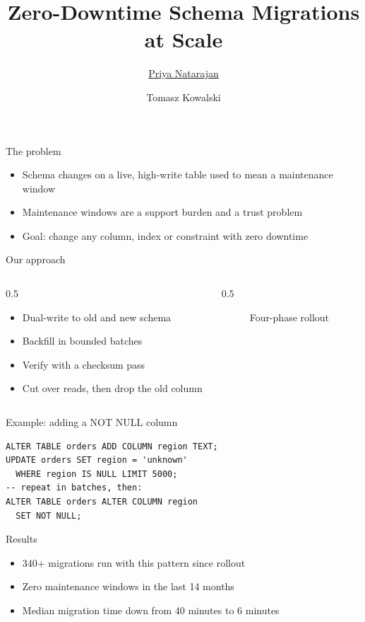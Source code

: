 \documentclass[14pt,aspectratio=169]{beamer}
\title{Zero-Downtime Schema Migrations at Scale}
\author{\underline{Priya Natarajan} \inst{1} \and Tomasz Kowalski \inst{1}}
\institute[shortinst]{\inst{1} Platform Engineering}
\begin{document}
{
  \begin{frame}
    \titlepage
  \end{frame}
}

\begin{frame}{The problem}
  \begin{itemize}
    \item Schema changes on a live, high-write table used to mean a maintenance window
    \item Maintenance windows are a support burden and a trust problem
    \item Goal: change any column, index or constraint with zero downtime
  \end{itemize}
\end{frame}

\begin{frame}{Our approach}
  \begin{columns}
    \begin{column}{0.5\linewidth}
      \begin{itemize}
        \item Dual-write to old and new schema
        \item Backfill in bounded batches
        \item Verify with a checksum pass
        \item Cut over reads, then drop the old column
      \end{itemize}
    \end{column}
    \begin{column}{0.5\linewidth}
      \begin{figure}
        \centering
        \caption{Four-phase rollout}
      \end{figure}
    \end{column}
  \end{columns}
\end{frame}

\begin{frame}[fragile]{Example: adding a NOT NULL column}
  \begin{verbatim}
ALTER TABLE orders ADD COLUMN region TEXT;
UPDATE orders SET region = 'unknown'
  WHERE region IS NULL LIMIT 5000;
-- repeat in batches, then:
ALTER TABLE orders ALTER COLUMN region
  SET NOT NULL;
  \end{verbatim}
\end{frame}

\begin{frame}{Results}
  \begin{itemize}
    \item 340+ migrations run with this pattern since rollout
    \item Zero maintenance windows in the last 14 months
    \item Median migration time down from 40 minutes to 6 minutes
  \end{itemize}
\end{frame}
\end{document}
